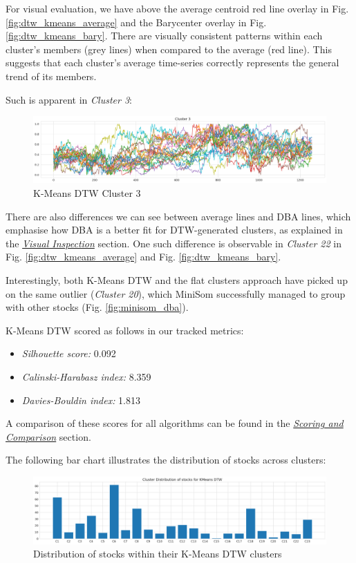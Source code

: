 \documentclass[11pt]{article}
\begin{document}
For visual evaluation, we have above the average centroid red line overlay in Fig. \ref{fig:dtw_kmeans_average} and the Barycenter overlay in  Fig. \ref{fig:dtw_kmeans_bary}. There are visually consistent patterns within each cluster's members (grey lines) when compared to the average (red line). This suggests that each cluster's average time-series correctly represents the general trend of its members.

Such is apparent in \textit{Cluster 3}: 

\begin{figure}[H]
\centering
\includegraphics[width=12cm]{img/kmeans-dtw-cluster3.png} 
\caption{K-Means DTW Cluster 3}
\label{fig:kmeans_dtw_c3}
\end{figure}

There are also differences we can see between average lines and DBA lines, which emphasise how DBA is a better fit for DTW-generated clusters, as explained in the \textit{\hyperref[sec:compare]{Visual Inspection}} section. One such difference is observable in \textit{Cluster 22} in Fig. \ref{fig:dtw_kmeans_average} and Fig. \ref{fig:dtw_kmeans_bary}.


Interestingly, both K-Means DTW and the flat clusters approach have picked up on the same outlier (\textit{Cluster 20}), which MiniSom successfully managed to group with other stocks (Fig. \ref{fig:minisom_dba}).



K-Means DTW scored as follows in our tracked metrics:
\begin{itemize}
    \item \textit{Silhouette score:} 0.092
    \item \textit{Calinski-Harabasz index:} 8.359
    \item \textit{Davies-Bouldin index:} 1.813
\end{itemize}


A comparison of these scores for all algorithms can be found in the \textit{\hyperref[sec:compare]{Scoring and Comparison}} section.

The following bar chart illustrates the distribution of stocks across clusters:

\begin{figure}[H]
\centering
\includegraphics[width=12cm]{img/dtw-kmeans-distribution.png} 
\caption{Distribution of stocks within their K-Means DTW clusters}
\label{fig:dtw_kmeans_distribution}
\end{figure}
\end{document}

